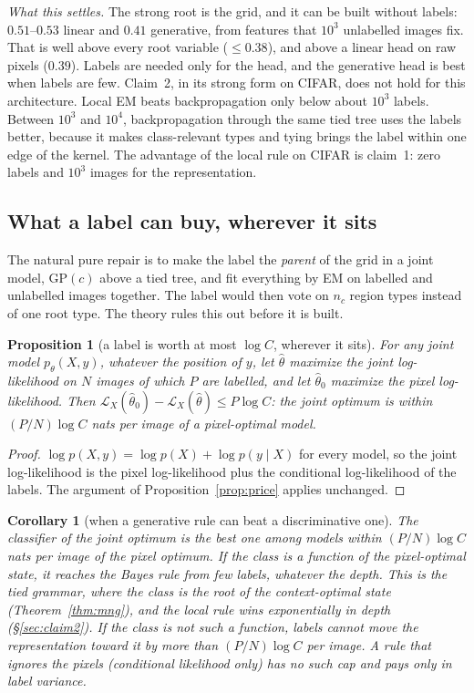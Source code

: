 \documentclass[11pt]{article}
\newtheorem{proposition}[theorem]{Proposition}
\newtheorem{corollary}[theorem]{Corollary}
\theoremstyle{definition}
\begin{document}
\emph{What this settles.} The strong root is the grid, and it can be built without labels: $0.51$--$0.53$ linear and $0.41$
generative, from features that $10^3$ unlabelled images fix. That is well above every root variable ($\le0.38$), and
above a linear head on raw pixels ($0.39$). Labels are needed only for the head, and the generative head is best when
labels are few. Claim~2, in its strong form on CIFAR, does not hold for this architecture. Local EM beats backpropagation
only below about $10^3$ labels. Between $10^3$ and $10^4$, backpropagation through the same tied tree uses the labels
better, because it makes class-relevant types and tying brings the label within one edge of the kernel. The advantage
of the local rule on CIFAR is claim~1: zero labels and $10^3$ images for the representation.

\subsection{What a label can buy, wherever it sits}\label{sec:labelworth}
The natural pure repair is to make the label the \emph{parent} of the grid in a joint model, $\mathrm{GP}(c)$ above a
tied tree, and fit everything by EM on labelled and unlabelled images together. The label would then vote on
$n_c$ region types instead of one root type. The theory rules this out before it is built.

\begin{proposition}[a label is worth at most $\log C$, wherever it sits]\label{prop:labelworth}
For any joint model $p_\theta(X,y)$, whatever the position of $y$, let $\hat\theta$ maximize the joint log-likelihood on
$N$ images of which $P$ are labelled, and let $\hat\theta_0$ maximize the pixel log-likelihood. Then
$\mathcal L_X(\hat\theta_0)-\mathcal L_X(\hat\theta)\le P\log C$: the joint optimum is within $(P/N)\log C$ nats per image of a
pixel-optimal model.
\end{proposition}
\begin{proof}
$\log p(X,y)=\log p(X)+\log p(y\mid X)$ for every model, so the joint log-likelihood is the pixel log-likelihood plus the
conditional log-likelihood of the labels. The argument of Proposition~\ref{prop:price} applies unchanged.
\end{proof}

\begin{corollary}[when a generative rule can beat a discriminative one]\label{cor:genvsdisc}
The classifier of the joint optimum is the best one among models within $(P/N)\log C$ nats per image of the pixel optimum.
If the class is a function of the pixel-optimal state, it reaches the Bayes rule from few labels, whatever the depth.
This is the tied grammar, where the class is the root of the context-optimal state (Theorem~\ref{thm:mng}), and the local rule
wins exponentially in depth (\S\ref{sec:claim2}). If the class is not such a function, labels cannot move the representation
toward it by more than $(P/N)\log C$ per image. A rule that ignores the pixels (conditional likelihood only) has no such cap
and pays only in label variance.
\end{corollary}
\end{document}
